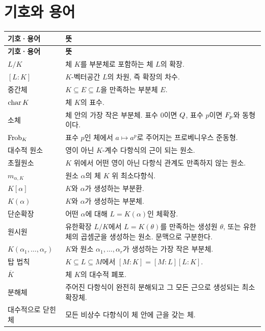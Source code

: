 \chapter*{기호와 용어}

\renewcommand{\arraystretch}{1.2}
\begin{longtable}{>{\raggedright\arraybackslash}p{}>{\raggedright\arraybackslash}p{}}
\toprule
\textbf{기호·용어} & \textbf{뜻} \\
\midrule
\endfirsthead
\toprule
\textbf{기호·용어} & \textbf{뜻} \\
\midrule
\endhead
\bottomrule
\endfoot

$L/K$ & 체 $K$를 부분체로 포함하는 체 $L$의 확장. \\
$[L:K]$ & $K$-벡터공간 $L$의 차원, 즉 확장의 차수. \\
중간체 & $K\subseteq E\subseteq L$을 만족하는 부분체 $E$. \\
$\operatorname{char} K$ & 체 $K$의 표수. \\
소체 & 체 안의 가장 작은 부분체. 표수 $0$이면 $Q$, 표수 $p$이면 $F_p$와 동형이다. \\
$\operatorname{Frob}_K$ & 표수 $p$인 체에서 $a\mapsto a^p$로 주어지는 프로베니우스 준동형. \\
대수적 원소 & 영이 아닌 $K$-계수 다항식의 근이 되는 원소. \\
초월원소 & $K$ 위에서 어떤 영이 아닌 다항식 관계도 만족하지 않는 원소. \\
$m_{\alpha,K}$ & 원소 $\alpha$의 체 $K$ 위 최소다항식. \\
$K[\alpha]$ & $K$와 $\alpha$가 생성하는 부분환. \\
$K(\alpha)$ & $K$와 $\alpha$가 생성하는 부분체. \\
단순확장 & 어떤 $\alpha$에 대해 $L=K(\alpha)$인 체확장. \\
원시원 & 유한확장 $L/K$에서 $L=K(\theta)$를 만족하는 생성원 $\theta$, 또는 유한체의 곱셈군을 생성하는 원소. 문맥으로 구분한다. \\
$K(\alpha_1,\dots,\alpha_r)$ & $K$와 원소 $\alpha_1,\dots,\alpha_r$가 생성하는 가장 작은 부분체. \\
탑 법칙 & $K\subseteq L\subseteq M$에서 $[M:K]=[M:L][L:K]$. \\
$\overline K$ & 체 $K$의 대수적 폐포. \\
분해체 & 주어진 다항식이 완전히 분해되고 그 모든 근으로 생성되는 최소 확장체. \\
대수적으로 닫힌 체 & 모든 비상수 다항식이 체 안에 근을 갖는 체. \\

\end{longtable}
